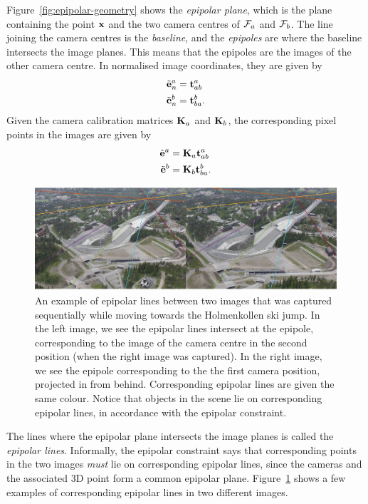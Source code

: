Figure~\ref{fig:epipolar-geometry} shows the \emph{epipolar plane}, which is the plane containing the point ${\boldsymbol{\mathbf{x}}}$ and the two camera centres of $\mathcal{F}_a$ and $\mathcal{F}_b$.
The line joining the camera centres is the \emph{baseline}, and the \emph{epipoles} are where the baseline intersects the image planes.
This means that the epipoles are the images of the other camera centre.
In normalised image coordinates, they are given by
\begin{align}
  \tilde{{\boldsymbol{\mathbf{e}}}}^a_n &= {\boldsymbol{\mathbf{t}}}^a_{ab}\\
  \tilde{{\boldsymbol{\mathbf{e}}}}^b_n &= {\boldsymbol{\mathbf{t}}}^b_{ba}.
\end{align}
Given the camera calibration matrices ${\boldsymbol{\mathbf{K}}}_a$ and ${\boldsymbol{\mathbf{K}}}_b$, the corresponding pixel points in the images are given by
\begin{align}
  \tilde{{\boldsymbol{\mathbf{e}}}}^a &= {\boldsymbol{\mathbf{K}}}_a {\boldsymbol{\mathbf{t}}}^a_{ab}\\
  \tilde{{\boldsymbol{\mathbf{e}}}}^b &= {\boldsymbol{\mathbf{K}}}_b {\boldsymbol{\mathbf{t}}}^b_{ba}.
\end{align}

\begin{figure}[htb]
    \centering
    \includegraphics[width=\columnwidth]{figures/epipoles-example.jpg}
    \caption{An example of epipolar lines between two images that was captured sequentially while moving towards the Holmenkollen ski jump.
    In the left image, we see the epipolar lines intersect at the epipole, corresponding to the image of the camera centre in the second position (when the right image was captured).
    In the right image, we see the epipole corresponding to the the first camera position, projected in from behind.
    Corresponding epipolar lines are given the same colour.
    Notice that objects in the scene lie on corresponding epipolar lines, in accordance with the epipolar constraint.
    }
    \label{fig:epipoles-example}
\end{figure}
The lines where the epipolar plane intersects the image planes is called the \emph{epipolar lines}.
Informally, the epipolar constraint says that corresponding points in the two images \emph{must} lie on corresponding epipolar lines, since the cameras and the associated 3D point form a common epipolar plane.
Figure~\ref{fig:epipoles-example} shows a few examples of corresponding epipolar lines in two different images.


